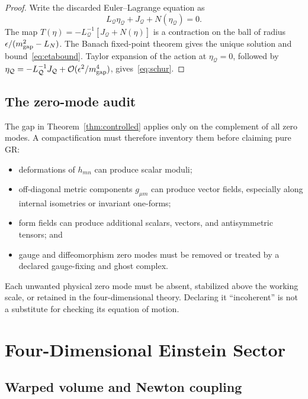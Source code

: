 \documentclass[11pt,a4paper]{article}
\theoremstyle{definition}
\theoremstyle{remark}
\newcommand{\cQ}{\mathcal Q}
\newcommand{\cO}{\mathcal O}
\begin{document}
\begin{proof}
Write the discarded Euler--Lagrange equation as
\[
 L_{\cQ}\eta_{\cQ}+J_{\cQ}+N(\eta_{\cQ})=0 .
\]
The map
\(
 T(\eta)=-L_{\cQ}^{-1}[J_{\cQ}+N(\eta)]
\)
is a contraction on the ball of radius
\(\epsilon/(m_{\rm gap}^{2}-L_N)\).  The Banach fixed-point theorem gives the
unique solution and bound~\eqref{eq:etabound}.  Taylor expansion of the action
at \(\eta_{\cQ}=0\), followed by
\(\eta_{\cQ}=-L_{\cQ}^{-1}J_{\cQ}+\cO(\epsilon^2/m_{\rm gap}^4)\),
gives~\eqref{eq:schur}.
\end{proof}

\subsection{The zero-mode audit}

The gap in Theorem~\ref{thm:controlled} applies only on the complement of all
zero modes.  A compactification must therefore inventory them before claiming
pure GR:
\begin{itemize}
\item deformations of \(h_{mn}\) can produce scalar moduli;
\item off-diagonal metric components \(g_{\mu m}\) can produce vector fields,
especially along internal isometries or invariant one-forms;
\item form fields can produce additional scalars, vectors, and antisymmetric
tensors; and
\item gauge and diffeomorphism zero modes must be removed or treated by a
declared gauge-fixing and ghost complex.
\end{itemize}
Each unwanted physical zero mode must be absent, stabilized above the working
scale, or retained in the four-dimensional theory.  Declaring it
``incoherent'' is not a substitute for checking its equation of motion.

\section{Four-Dimensional Einstein Sector}

\subsection{Warped volume and Newton coupling}
\end{document}

